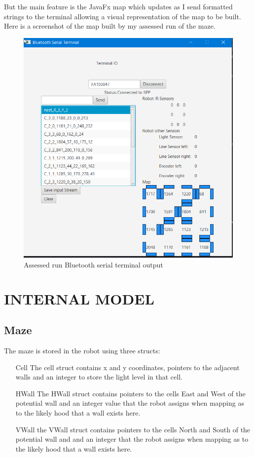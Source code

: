 \documentclass[11pt,a4paper,titlepage]{article}
\begin{document}
            But the main feature is the JavaFx map which updates as I send formatted strings to the terminal allowing a visual representation of the map to be built. 
            Here is a screenshot of the map built by my assessed run of the maze.
            \begin{figure}[H]
                \caption{Assessed run Bluetooth serial terminal output}
                \includegraphics[width=14cm,keepaspectratio]{assessedRun}
            \end{figure}
    \section{INTERNAL MODEL}
        \subsection{Maze}
            The maze is stored in the robot using three structs:
            
            \begin{itemize}
                \item[Cell] The cell struct contains x and y coordinates, pointers to the adjacent walls and an integer to store the light level in that cell.
                \item[HWall] The HWall struct contains pointers to the cells East and West of the potential wall and an integer value that the robot assigns when mapping as to the likely hood that a wall exists here.
                \item[VWall] the VWall struct contains pointers to the cells North and South of the potential wall and and an integer that the robot assigns when mapping as to the likely hood that a wall exists here.
            \end{itemize}
\end{document}
